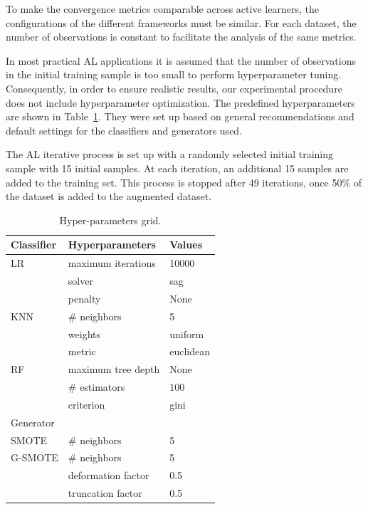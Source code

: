\documentclass[parskip=full]{scrartcl}
\begin{document}
To make the convergence metrics comparable across active learners, the
configurations of the different frameworks must be similar. For each dataset,
the number of observations is constant to facilitate the analysis of the same
metrics. 

In most practical AL applications it is assumed that the number of observations
in the initial training sample is too small to perform hyperparameter tuning.
Consequently, in order to ensure realistic results, our experimental procedure
does not include hyperparameter optimization. The predefined hyperparameters are
shown in Table~\ref{tab:grid}. They were set up based on general recommendations
and default settings for the classifiers and generators used.

The AL iterative process is set up with a randomly selected initial training
sample with 15 initial samples. At each iteration, an additional 15 samples are
added to the training set. This process is stopped after 49 iterations, once
50\% of the dataset is added to the augmented dataset.

\begin{table}[H]
	\centering
	\begin{tabular}{lll}
		\toprule
		Classifier & Hyperparameters      & Values             \\
		\midrule
		LR         & maximum iterations   & 10000              \\
		           & solver               & sag                \\
                   & penalty              & None               \\
		KNN        & \# neighbors         & 5                  \\
                   & weights              & uniform            \\
                   & metric               & euclidean          \\
		RF         & maximum tree depth   & None               \\
		           & \# estimators        & 100                \\
                   & criterion            & gini               \\
		\toprule
		Generator  &                      &                    \\
		\midrule
		SMOTE      & \# neighbors         & 5                  \\
		G-SMOTE    & \# neighbors         & 5                  \\
                   & deformation factor   & 0.5                \\
                   & truncation factor    & 0.5                \\
		\bottomrule
	\end{tabular}
    \caption{\label{tab:grid}Hyper-parameters grid.}
\end{table}
\end{document}
